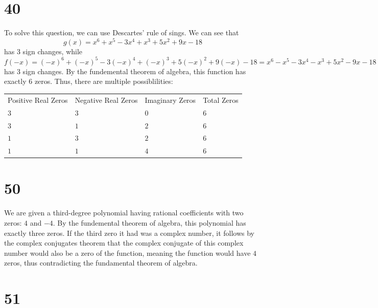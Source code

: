 \documentclass{article}
\theoremstyle{definition}
\begin{document}
\section*{40}


To solve this question, we can use Descartes' rule of sings. We can see that \[ g(x)=x^6+x^5-3x^4+x^3+5x^2+9x-18 \] has 3 sign changes, while 
\[ f(-x)=(-x)^6+(-x)^5-3(-x)^4+(-x)^3+5(-x)^2+9(-x)-18=x^6-x^5-3x^4-x^3+5x^2-9x-18 \] has 3 sign changes. By the fundemental theorem of algebra, this 
function has exactly 6 zeros. Thus, there are multiple possiblilities:
\begin{center}
	\begin{tabular}{l|l|l|l}
		Positive Real Zeros & Negative Real Zeros & Imaginary Zeros & Total Zeros \\
		$3$ & $3$ & $0$ & $6$ \\
		$3$ & $1$ & $2$ & $6$ \\
		$1$ & $3$ & $2$ & $6$ \\
		$1$ & $1$ & $4$ & $6$
	\end{tabular}
\end{center}

\section*{50}


We are given a third-degree polynomial having rational coefficients with two zeros: $4$ and $-4$. 
By the fundemental theorem of algebra, this polynomial has exactly three zeros. If 
the third zero it had was a complex number, it follows by the complex conjugates theorem 
that the complex conjugate of this complex number would also be a zero of the function, meaning the 
function would have $4$ zeros, thus contradicting the fundamental theorem of algebra. 

\section*{51}
\end{document}

